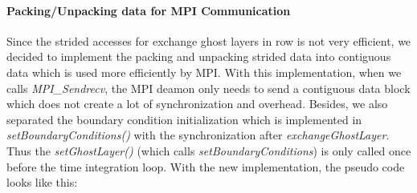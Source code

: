 \documentclass[article]{scrartcl}
\begin{document}
\paragraph{Packing/Unpacking data for MPI Communication} Since the strided accesses for exchange ghost layers in row is not very efficient, we decided to implement the packing and unpacking strided data into contiguous data which is used more efficiently by MPI. With this implementation, when we calls \textit{MPI\_Sendrecv}, the MPI deamon only needs to send a contiguous data block which does not create a lot of synchronization and overhead. Besides, we also separated the boundary condition initialization which is implemented in \textit{setBoundaryConditions()} with the synchronization after \textit{exchangeGhostLayer}. Thus the \textit{setGhostLayer()} (which calls \textit{setBoundaryConditions}) is only called once before the time integration loop. With the new implementation, the pseudo code looks like this:
\end{document}
